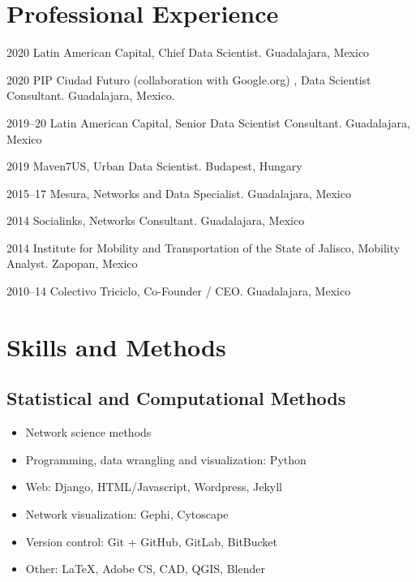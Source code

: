 \documentclass{academiccv}
\begin{document}
\section*{Professional Experience}
\begin{tablist}
	\item[2020] \tab Latin American Capital, Chief Data Scientist. Guadalajara, Mexico
	\item[2020] \tab PIP Ciudad Futuro (collaboration with Google.org) , Data Scientist Consultant. Guadalajara, Mexico. 
	\item[2019--20] \tab Latin American Capital, Senior Data Scientist Consultant. Guadalajara, Mexico
	\item[2019] \tab Maven7US, Urban Data Scientist. Budapest, Hungary
	\item[2015--17] \tab Mesura, Networks and Data Specialist. Guadalajara, Mexico
	\item[2014] \tab Socialinks, Networks Consultant. Guadalajara, Mexico
	\item[2014] \tab Institute for Mobility and Transportation of the State of Jalisco, Mobility Analyst. Zapopan, Mexico
	\item[2010--14] \tab Colectivo Triciclo, Co-Founder / CEO. Guadalajara, Mexico
\end{tablist}


\section*{Skills and Methods}
\subsection*{Statistical and Computational Methods}
\begin{itemize}
	\item Network science methods
	\item Programming, data wrangling and visualization: Python
	\item Web: Django, HTML/Javascript, Wordpress, Jekyll
	\item Network visualization: Gephi, Cytoscape
	\item Version control: Git +  {GitHub, GitLab, BitBucket}
	\item Other: \LaTeX, Adobe CS, CAD, QGIS, Blender
\end{itemize}
\end{document}
